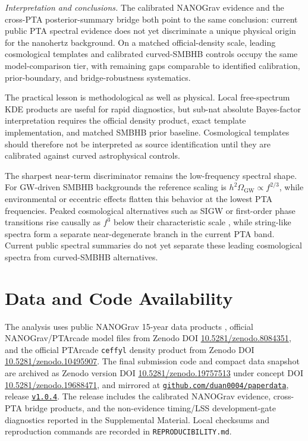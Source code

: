 \documentclass[aps,prl,reprint,superscriptaddress,nofootinbib,floatfix]{revtex4-2}
\begin{document}
\emph{Interpretation and conclusions.}
The calibrated NANOGrav evidence and the cross-PTA posterior-summary
bridge both point to the same conclusion: current public PTA spectral
evidence does not yet discriminate a unique physical origin for the nanohertz
background.  On a matched official-density scale, leading cosmological
templates and calibrated curved-SMBHB controls occupy the same
model-comparison tier, with remaining gaps comparable to identified
calibration, prior-boundary, and bridge-robustness systematics.

The practical lesson is methodological as well as physical.  Local
free-spectrum KDE products are useful for rapid diagnostics, but sub-nat
absolute Bayes-factor interpretation requires the official density
product, exact template implementation, and matched SMBHB prior baseline.
Cosmological templates should therefore not be interpreted as source
identification until they are calibrated against curved astrophysical
controls.

The sharpest near-term discriminator remains the low-frequency spectral
shape.  For GW-driven SMBHB backgrounds the reference scaling is
$h^2\Omega_\mathrm{GW}\propto f^{2/3}$, while environmental or eccentric
effects flatten this behavior at the lowest PTA frequencies.  Peaked
cosmological alternatives such as SIGW or first-order phase transitions
rise causally as $f^3$ below their characteristic scale
\cite{Caprini_Figueroa_2018}, while string-like spectra form a separate
near-degenerate branch in the current PTA band.  Current public spectral
summaries do not yet separate these leading cosmological spectra from
curved-SMBHB alternatives.

\section*{Data and Code Availability}

The analysis uses public NANOGrav 15-year data products
\cite{NANOGrav_15yr_GWB,NANOGrav_15yr_noise,NANOGrav_15yr_timing},
official
NANOGrav/PTArcade model files from Zenodo DOI
\href{https://doi.org/10.5281/zenodo.8084351}{10.5281/zenodo.8084351},
and the official PTArcade \texttt{ceffyl} density product from Zenodo
DOI \href{https://doi.org/10.5281/zenodo.10495907}
{10.5281/zenodo.10495907}.  The final submission code and compact data
snapshot are archived as Zenodo version DOI
\href{https://doi.org/10.5281/zenodo.19757513}{10.5281/zenodo.19757513}
under concept DOI
\href{https://doi.org/10.5281/zenodo.19688471}{10.5281/zenodo.19688471},
and mirrored at \href{https://github.com/duan0004/paperdata}
{\texttt{github.com/duan0004/paperdata}}, release
\href{https://github.com/duan0004/paperdata/releases/tag/v1.0.4}
{\texttt{v1.0.4}}.  The release includes the calibrated NANOGrav evidence,
cross-PTA bridge products, and the non-evidence timing/LSS development-gate
diagnostics reported in the Supplemental Material.  Local checksums and
reproduction commands are recorded in \texttt{REPRODUCIBILITY.md}.
\end{document}
